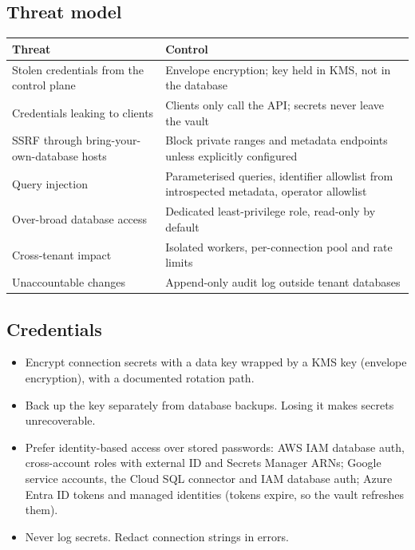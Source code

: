 \documentclass[11pt,a4paper]{article}
\begin{document}
\subsection{Threat model}
\begin{tabularx}{\linewidth}{@{}>{\raggedright\arraybackslash}p{5.0cm}X@{}}
\toprule
\textbf{Threat} & \textbf{Control}\\
\midrule
Stolen credentials from the control plane & Envelope encryption; key held in KMS, not in the database\\
Credentials leaking to clients & Clients only call the API; secrets never leave the vault\\
SSRF through bring-your-own-database hosts & Block private ranges and metadata endpoints unless explicitly configured\\
Query injection & Parameterised queries, identifier allowlist from introspected metadata, operator allowlist\\
Over-broad database access & Dedicated least-privilege role, read-only by default\\
Cross-tenant impact & Isolated workers, per-connection pool and rate limits\\
Unaccountable changes & Append-only audit log outside tenant databases\\
\bottomrule
\end{tabularx}\smallskip

\subsection{Credentials}
\begin{itemize}
  \item Encrypt connection secrets with a data key wrapped by a KMS key (envelope encryption), with a documented rotation path.
  \item Back up the key separately from database backups. Losing it makes secrets unrecoverable.
  \item Prefer identity-based access over stored passwords: AWS IAM database auth, cross-account roles with external ID and Secrets Manager ARNs; Google service accounts, the Cloud SQL connector and IAM database auth; Azure Entra ID tokens and managed identities (tokens expire, so the vault refreshes them).
  \item Never log secrets. Redact connection strings in errors.
\end{itemize}
\end{document}
